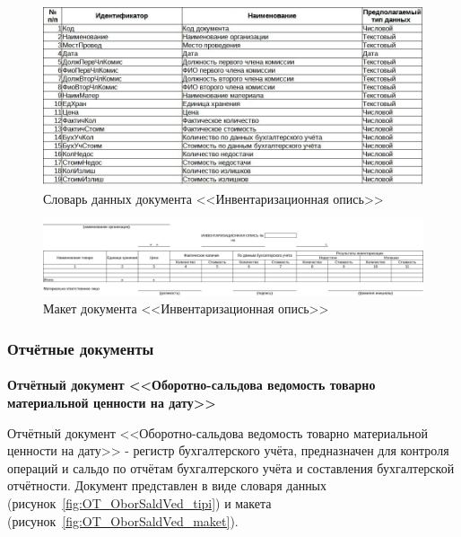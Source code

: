 \documentclass[12pt, a4paper, simple]{eskdtext}
\begin{document}
    \begin{figure}[!h]
        \centering
        \includegraphics[width=14cm]
            {_docs/ОП_ИнвенОпис_типы.jpg}
        \caption{Словарь данных документа <<Инвентаризационная опись>>}
        \label{fig:OP_InvenOpis_tipi}
    \end{figure}

    \begin{figure}[!h]
        \centering
        \includegraphics[width=14cm]
            {_docs/ОП_ИнвенОпис_макет.jpg}
        \caption{Макет документа <<Инвентаризационная опись>>}
        \label{fig:OP_InvenOpis_maket}
    \end{figure}

    \newpage

    \subsubsection{Отчётные документы}

    \paragraph{} \textbf{Отчётный документ <<Оборотно-сальдова ведомость товарно материальной ценности на дату>>}

    Отчётный документ <<Оборотно-сальдова ведомость товарно материальной ценности на дату>>
    - регистр бухгалтерского учёта, предназначен для контроля операций
    и сальдо по отчётам бухгалтерского учёта и составления бухгалтерской отчётности.
    Документ представлен в виде словаря данных (рисунок~\ref{fig:OT_OborSaldVed_tipi})
    и макета (рисунок~\ref{fig:OT_OborSaldVed_maket}).
\end{document}
